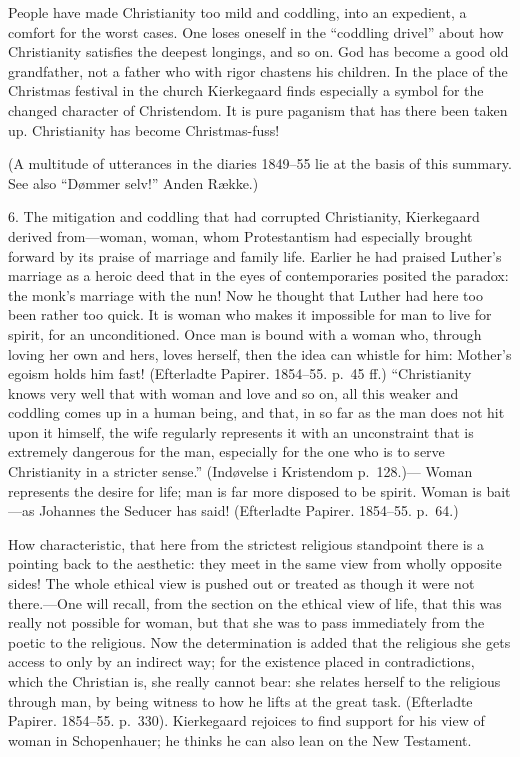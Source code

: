 \documentclass[12pt,a4paper]{book}
\newcommand{\opage}[1]{\marginnote{\footnotesize\textit{[#1]}}}
\begin{document}
People have made Christianity too mild and coddling, into an expedient,
a comfort for the worst cases. One loses oneself in the ``coddling
drivel'' about how Christianity satisfies the deepest longings, and so
on. God has become a good old grandfather, not a father who with rigor
chastens his children. In the place of the Christmas festival in the
church Kierkegaard finds especially a symbol for the changed character
of Christendom. It is pure paganism that has there been taken up.
Christianity has become Christmas-fuss!

(A multitude of utterances in the diaries 1849--55 lie at the basis of
this summary. See also ``Dømmer selv!'' Anden Række.)

6. The mitigation and coddling that had corrupted Christianity,
Kierkegaard derived from---woman, woman, whom Protestantism had
especially brought forward by its praise of marriage and family life.
Earlier he had praised Luther's marriage as a heroic deed that in the
eyes of contemporaries posited the paradox: the monk's marriage with the
nun! Now he thought that Luther had here too been rather too quick. It
is woman who makes it impossible for man to live
\opage{141}for spirit, for an unconditioned. Once man is bound with a
woman who, through loving her own and hers, loves herself, then the idea
can whistle for him: Mother's egoism holds him fast! (Efterladte
Papirer. 1854--55. p.~45 ff.) ``Christianity knows very well that with
woman and love and so on, all this weaker and coddling comes up in a
human being, and that, in so far as the man does not hit upon it
himself, the wife regularly represents it with an unconstraint that is
extremely dangerous for the man, especially for the one who is to serve
Christianity in a stricter sense.'' (Indøvelse i Kristendom p.~128.)---
Woman represents the desire for life; man is far more disposed to be
spirit. Woman is bait---as Johannes the Seducer has said! (Efterladte
Papirer. 1854--55. p.~64.)

How characteristic, that here from the strictest religious standpoint
there is a pointing back to the aesthetic: they meet in the same view
from wholly opposite sides! The whole ethical view is pushed out or
treated as though it were not there.---One will recall, from the section
on the ethical view of life, that this was really not possible for
woman, but that she was to pass immediately from the poetic to the
religious. Now the determination is added that the religious she gets
access to only by an indirect way; for the existence placed in
contradictions, which the Christian is, she really cannot bear: she
relates herself to the religious through man, by being witness to how he
lifts at the great task. (Efterladte Papirer. 1854--55. p.~330).
Kierkegaard rejoices to find support for his view of woman in
Schopenhauer; he thinks he can also lean on the New Testament.
\end{document}
